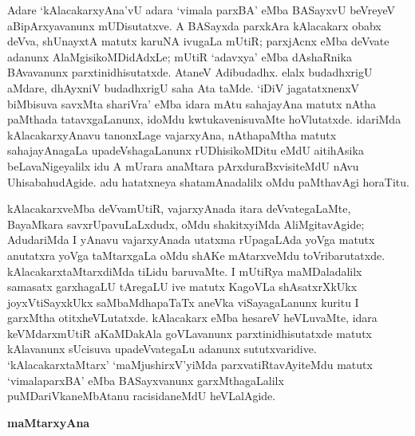 Adare `kAlacakarxyAna'vU adara `vimala parxBA' eMba BASayxvU beVreyeV aBipArxyavanunx mUDisutatxve. A BASayxda parxkAra kAlacakarx obabx deVva, shUnayxtA matutx karuNA ivugaLa mUtiR; parxjAcnx eMba deVvate adanunx AlaMgisikoMDidAdxLe; mUtiR `adavxya' eMba dAshaRnika BAvavanunx parxtinidhisutatxde. AtaneV Adibudadhx. elalx budadhxrigU aMdare, dhAyxniV budadhxrigU saha Ata taMde. `iDiV jagatatxnenxV biMbisuva savxMta shariVra' eMba idara mAtu sahajayAna matutx nAtha paMthada tatavxgaLanunx, idoMdu kwtukavenisuvaMte hoVlutatxde. idariMda kAlacakarxyAnavu tanonxLage vajarxyAna, nAthapaMtha matutx sahajayAnagaLa upadeVshagaLanunx rUDhisikoMDitu eMdU aitihAsika beLavaNigeyalilx idu A mUrara anaMtara pArxduraBxvisiteMdU nAvu UhisabahudAgide. adu hatatxneya shatamAnadalilx oMdu paMthavAgi horaTitu.

kAlacakarxveMba deVvamUtiR, vajarxyAnada itara deVvategaLaMte, BayaMkara savxrUpavuLaLxdudx, oMdu shakitxyiMda AliMgitavAgide; AdudariMda I yAnavu vajarxyAnada utatxma rUpagaLAda yoVga matutx anutatxra yoVga taMtarxgaLa oMdu shAKe mAtarxveMdu toVribarutatxde. kAlacakarxtaMtarxdiMda tiLidu baruvaMte. I mUtiRya maMDaladalilx samasatx garxhagaLU tAregaLU ive matutx KagoVLa shAsatxrXkUkx joyxVtiSayxkUkx saMbaMdhapaTaTx aneVka viSayagaLanunx kuritu I garxMtha otitxheVLutatxde. kAlacakarx eMba hesareV heVLuvaMte, idara keVMdarxmUtiR aKaMDakAla goVLavanunx parxtinidhisutatxde matutx kAlavanunx sUcisuva upadeVvategaLu adanunx sututxvaridive. `kAlacakarxtaMtarx' `maMjushirxV'yiMda parxvatiRtavAyiteMdu matutx `vimalaparxBA' eMba BASayxvanunx  garxMthagaLalilx puMDariVkaneMbAtanu racisidaneMdU heVLalAgide.

\smallskip
\begin{center}
{\Large\bf maMtarxyAna}
\end{center}

